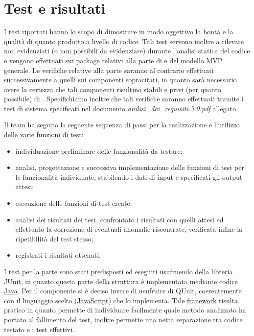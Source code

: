 \section{Test e risultati}
I test riportati hanno lo scopo di dimostrare in modo oggettivo la bontà e la qualità di quanto prodotto a livello di codice. Tali test servono inoltre a rilevare  non evidenziati (o non possibili da evidenziare) durante l'analisi statica del codice e vengono effettuati sui package relativi alla parte di  e  del modello MVP generale.
Le verifiche relative alla parte  saranno al contrario effettuati successivamente a quelli sui componenti sopracitati, in quanto sarà necessario avere la certezza che tali componenti risultino stabili e privi (per quanto possibile) di . 
Specifichiamo inoltre che tali verifiche saranno effettuati tramite i test di sistema specificati nel documento \textit{anilisi\_dei\_requisiti.3.0.pdf} allegato.

Il team ha seguito la seguente sequenza di passi per la realizzazione e l'utilizzo delle varie funzioni di test:
\begin{itemize}
\item individuazione preliminare delle funzionalità da testare;
\item analisi, progettazione e successiva implementazione delle funzioni di test per le funzionalità individuate, stabilendo i dati di input e specificati gli output attesi;
\item esecuzione delle funzioni di test create.
\item analisi dei risultati dei test, confrontato i risultati con quelli attesi ed effettuato la correzione di eventuali anomalie riscontrate, verificata infine la ripetibilità del test stesso;
\item registrati i risultati ottenuti.
\end{itemize}

I test per la parte  sono stati predisposti ed eseguiti usufruendo della libreria JUnit, in quanto questa parte della struttura è implementata mediante codice \underline{Java}.
Per il componente  si è deciso invece di usufruire di QUnit, coerentemente con il linguaggio scelto (\underline{JavaScript}) che lo implementa. Tale \underline{franework} risulta pratico in quanto permette di individuare facilmente quale metodo analizzato ha portato al fallimento del test, inoltre permette una netta separazione tra codice testato e i test effettivi.

